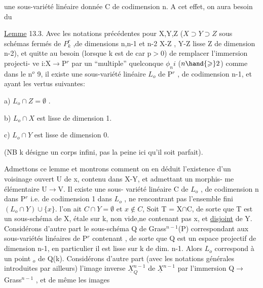 
une sous-variété linéaire donnée C  de codimension n.  A cet effet,
on aura besoin du

\uline{Lemme} 13.3.  Avec les notations précédentes pour  X,Y,Z  ($X\supset Y\supset Z$
sous schémas fermés de $P^r_k$ ,de dimensions n,n-1 et \hand{$\leqslant$} n-2 X-Z\hand{,} ,
Y-Z lisse \hand{,} Z de dimension \hand{$\leqslant$}n-2), et quitte
au besoin (lorsque k est de car p$>$0)  de remplacer l'immersion projecti-%
ve  i:X$\rightarrow$P$^r$  par  un ``multiple'' quelconque $\phi_n i$ ($n \hand{\geqslant} 2$)  comme dans le
n$^o$ 9,  il existe une sous-variété linéaire  $L_o$ de P$^r$ , de codimension
n-1, et ayant les vertus suivantes:

a)  $L_o \cap Z = \emptyset$ .

b)  $L_o \cap X$  est lisse de dimension 1.

c)  $L_o \cap Y$   est lisse de dimension  0.

(NB  k désigne un corps infini, pas la peine ici qu'il soit parfait).

Admettons  ce lemme  et montrons comment on en déduit  l'existence
d'un voisinage ouvert U de x, contenu dans X-Y, et admettant un morphis-%
me élémentaire U$\longrightarrow$V.  
 Il existe une sous-%
variété linéaire C de $L_o$ , de codimension n dans P$^r$ i.e. de codimension
1 dans $L_o$ , ne rencontrant pas l'ensemble fini  $(L_o\cap Y)\cup\{x\}$. 
 l'on ait  $C \cap Y = \emptyset$ et $x\notin C$, 
 Soit  T = X$\cap$C, de sorte que T est un sous-schéma de X,
étale sur k, non vide,ne contenant pas x, et \uline{disjoint} de Y.  Considérons d'autre part le
sous-schéma Q de Grass$^{n-1}$(P) correspondant aux sous-variétés linéaires
de P$^r$ contenant , de sorte que  Q est un  espace projectif
de dimension n-1,   en particulier il est lisse sur k de dim. n-1.
Alors $L_o$ correspond à un point \hand{$\xi$}$_o$ de Q(k).  Considérons d'autre part
(avec les notations générales introduites par ailleurs)  l'image inverse
$\underline{X}^{n-1}_Q$ de $\underline{X}^{n-1}$  par  l'immersion Q$\longrightarrow$ Grass$^{n-1}$ , et de même les images

